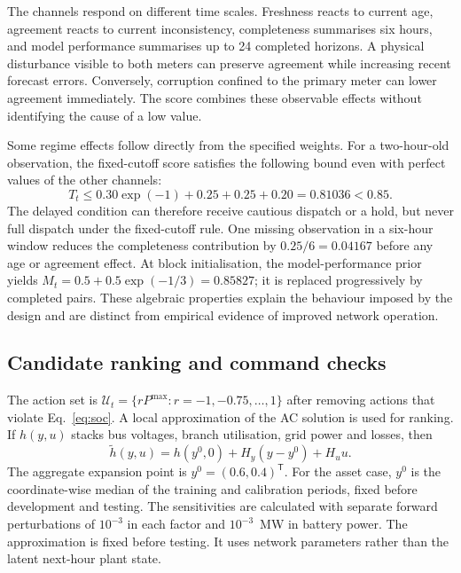 \documentclass[preprint,12pt]{elsarticle}
\begin{document}
The channels respond on different time scales. Freshness reacts to current age, agreement reacts to current inconsistency, completeness summarises six hours, and model performance summarises up to 24 completed horizons. A physical disturbance visible to both meters can preserve agreement while increasing recent forecast errors. Conversely, corruption confined to the primary meter can lower agreement immediately. The score combines these observable effects without identifying the cause of a low value.

Some regime effects follow directly from the specified weights. For a two-hour-old observation, the fixed-cutoff score satisfies the following bound even with perfect values of the other channels:
\begin{equation}
T_t\leq0.30\exp(-1)+0.25+0.25+0.20=0.81036<0.85.
\label{eq:delaybound}
\end{equation}
The delayed condition can therefore receive cautious dispatch or a hold, but never full dispatch under the fixed-cutoff rule. One missing observation in a six-hour window reduces the completeness contribution by $0.25/6=0.04167$ before any age or agreement effect. At block initialisation, the model-performance prior yields $M_t=0.5+0.5\exp(-1/3)=0.85827$; it is replaced progressively by completed pairs. These algebraic properties explain the behaviour imposed by the design and are distinct from empirical evidence of improved network operation.


\subsection{Candidate ranking and command checks}
The action set is $\mathcal U_t=\{rP^{\max}:r=-1,-0.75,\ldots,1\}$ after removing actions that violate Eq.~\eqref{eq:soc}. A local approximation of the AC solution is used for ranking. If $h(y,u)$ stacks bus voltages, branch utilisation, grid power and losses, then
\begin{equation}
\widetilde h(y,u)=h(y^0,0)+H_y(y-y^0)+H_u u.\label{eq:linear}
\end{equation}
The aggregate expansion point is $y^0=(0.6,0.4)^{\mathsf T}$. For the asset case, $y^0$ is the coordinate-wise median of the training and calibration periods, fixed before development and testing. The sensitivities are calculated with separate forward perturbations of $10^{-3}$ in each factor and $10^{-3}$~MW in battery power. The approximation is fixed before testing. It uses network parameters rather than the latent next-hour plant state.
\end{document}

